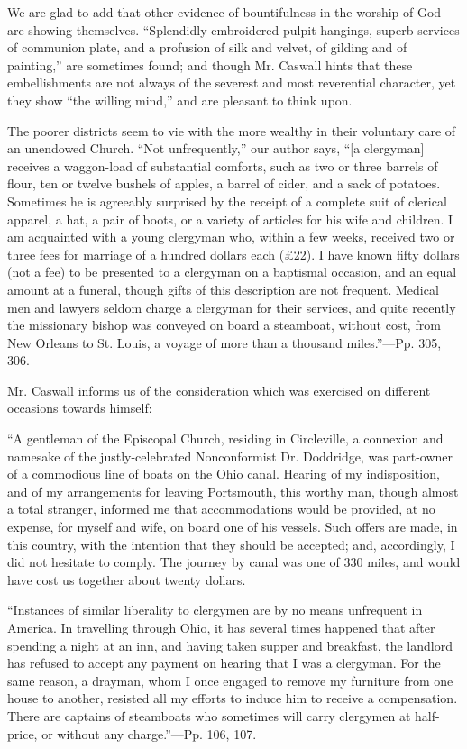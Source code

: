 We are glad to add that other evidence of
bountifulness in the worship of God are showing themselves.
``Splendidly embroidered pulpit hangings, superb services of
communion plate, and a profusion of silk and velvet, of gilding and of
painting,'' are sometimes found; and though Mr. Caswall hints that
these embellishments are not always of the severest and most
reverential character, yet they show ``the willing mind,'' and are
pleasant to think upon.

The poorer districts seem to vie with the more
wealthy in their voluntary care of an unendowed Church. ``Not
unfrequently,'' our author says, ``[a clergyman] receives a waggon-load
of substantial comforts, such as two or three barrels of flour, ten or
twelve bushels of apples, a barrel of cider, and a sack of potatoes.
Sometimes he is agreeably surprised by the receipt of a complete suit
of clerical apparel, a hat, a pair of boots, or a variety of articles
for his wife and children. I am acquainted with a young clergyman who,
within a few weeks, received two or three fees for marriage of a
hundred dollars each (£22). I have known fifty dollars (not a fee) to
be presented to a clergyman on a baptismal occasion, and an equal
amount at a funeral, though gifts of this description are not
frequent. Medical men and lawyers seldom charge a clergyman for their
services, and quite recently the missionary bishop was conveyed on
board a steamboat, without cost, from New Orleans to St. Louis, a
voyage of more than a thousand miles.''—Pp. 305, 306.

Mr. Caswall informs us of the consideration which
was exercised on different occasions towards himself:

``A
gentleman of the Episcopal Church, residing in Circleville, a
connexion and namesake of the justly-celebrated Nonconformist Dr.
Doddridge, was part-owner of a commodious line of boats on the Ohio
canal. Hearing of my indisposition, and of my arrangements for leaving
Portsmouth, this worthy man, though almost a total
stranger, informed me that accommodations would be provided, at no
expense, for myself and wife, on board one of his vessels. Such offers
are made, in this country, with the intention that they should be
accepted; and, accordingly, I did not hesitate to comply. The journey
by canal was one of 330 miles, and would have cost us together about
twenty dollars.

``Instances
of similar liberality to clergymen are by no means unfrequent in
America. In travelling through Ohio, it has several times happened
that after spending a night at an inn, and having taken supper and
breakfast, the landlord has refused to accept any payment on hearing
that I was a clergyman. For the same reason, a drayman, whom I once
engaged to remove my furniture from one house to another, resisted all
my efforts to induce him to receive a compensation. There are captains
of steamboats who sometimes will carry clergymen at half-price, or
without any charge.''—Pp. 106, 107.

